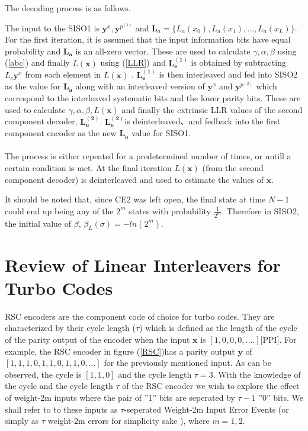 \documentclass[20 pts]{article}
\begin{document}
    
  The decoding process is as follows.
  

The input to the SISO1 is $\mathbf{y}^x,\mathbf{y}^{p^{(1)}}$ 
and $\mathbf{L}_a=\{L_a(x_0),L_a(x_1),...,L_a(x_{L})\}$. 
For the first iteration, it is assumed 
that the input information bits have equal probability and $\mathbf{L_a}$ is an 
all-zero vector.
These are used to calculate $\gamma ,\alpha , \beta$ using (\ref{abc})
 and finally
$ L(\mathbf{x})$ using (\ref{LLR}) and $\mathbf{L_e^{(1)}}$ is obtained by subtracting
 $L_c\mathbf{y}^x$  from each element in $ L(\mathbf{x})$ .
$\mathbf{L_e^{(1)}}$ is then
 interleaved and fed into SISO2 as the value for
 $\mathbf{L_a}$ along with an interleaved version of $\mathbf{y}^{x}$ and 
 $ \mathbf{y}^{p^{(2)}}$ which correspond to
 the interleaved systematic bits and the lower parity bits. These are used to calculate 
 $\gamma,\alpha , 
\beta, L(\mathbf{x})$
 and finally the extrinsic LLR values 
of the second component decoder, $\mathbf{L_e^{(2)}}$.
$\mathbf{L_e^{(2)}}$is deinterleaved、and fedback into the first component encoder
 as the new $\mathbf{L_a}$ value for SISO1.
\paragraph{}
The process is either repeated for a predetermined number of times, or untill a certain 
condition is met. At the final iteration $ L(\mathbf{x})$ (from the second component
 decoder) is deinterleaved and used to estimate the values of $\mathbf{x}$.
 
  It should be noted that, since CE2 was left open, 
 the final state at time $N-1$ could end up being any of the $2^m$ states with 
 probability $\frac{1}{2^m}$. Therefore in SISO2, the initial
 value of $\beta$, $\beta_L(\sigma)=-ln(2^m)$.

\section{Review of Linear Interleavers for Turbo Codes}
 RSC encoders are the component code of choice for turbo codes. They are
characterized by their cycle length ($\tau$) which is defined as the length of the cycle
 of the parity output of the encoder when the input $\mathbf{x}$ is $[1,0,0,0,....]$[PPI]. 
For example, the RSC encoder in figure (\ref{RSC})has a parity output $\mathbf{y}$ of 
$[1,1,1,0,1,1,0,1,1,0,...]$
for the previously mentioned input. As can be observed, the cycle is $[1,1,0]$ and
the cycle length $\tau=3$. With the knowledge of the cycle and the cycle length $\tau$
of the RSC encoder we wish to explore the effect of weight-2m inputs where the pair of
''1'' bits
 are seperated by $\tau-1$ ''0'' bits. We shall refer to to these inputs as
 $\tau$-seperated Weight-2m Input Error Events (or simply as $\tau$ weight-2m errors for
 simplicity sake ), where $m={1,2}$. 
\end{document}
